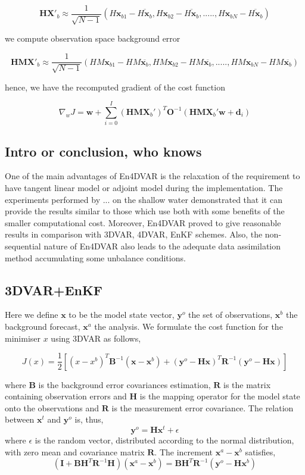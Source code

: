 \documentclass[a4,12pt]{article}
\numberwithin{equation}{section}
\begin{document}
$$\textbf{HX}'_{b} \approx \frac{1}{\sqrt{N-1}}(H\textbf{x}_{b1}-\overline{H\textbf{x}_{b}},H\textbf{x}_{b2}-\overline{H\textbf{x}_{b}},.....,H\textbf{x}_{bN}-\overline{H\textbf{x}_{b}})$$

we compute observation space background error

$$\textbf{HMX}'_{b} \approx \frac{1}{\sqrt{N-1}}(HM\textbf{x}_{b1}-HM\overline{\textbf{x}_{b}}, HM\textbf{x}_{b2}-HM\overline{\textbf{x}_{b}},.....,HM\textbf{x}_{bN}-HM\overline{\textbf{x}_{b}} )$$

hence, we have the recomputed gradient of the cost function

$$\nabla _{w}J = \textbf{w} + \sum_{i=0}^{I}(\textbf{HMX}_{b}')^{T}\textbf{O}^{-1}(\textbf{HMX}_{b}'\textbf{w}+\textbf{d}_{i})$$

\subsection{Intro or conclusion, who knows}

One of the main advantages of En4DVAR is the relaxation of the requirement to have tangent linear model or adjoint model during the implementation. The experiments performed by ... on the shallow water demonstrated that it can  provide the results similar to those which use both with some benefits of the smaller computational cost. Moreover, En4DVAR proved to give reasonable results in comparison with 3DVAR, 4DVAR, EnKF schemes. Also, the non-sequential nature of En4DVAR also leads to the adequate data assimilation method accumulating some unbalance conditions.  


\subsection{3DVAR+EnKF}
Here we define $\textbf{x}$ to be the model state vector, $\textbf{y}^{o}$ the set of observations, $\textbf{x}^{b}$ the background forecast, $\textbf{x}^{a}$ the analysis. We formulate the cost function for the minimiser $x$ using 3DVAR as follows,

$$J(x) = \frac{1}{2}[(x-x^{b})^{T}\textbf{B}^{-1}(\textbf{x}-\textbf{x}^{b})+(\textbf{y}^{o}-\textbf{H}\textbf{x})^{T}\textbf{R}^{-1}(\textbf{y}^{o}-\textbf{Hx})]$$

where $\textbf{B}$ is the background error covariances estimation, $\textbf{R}$ is the matrix containing observation errors and $\textbf{H}$ is the mapping operator for the model state onto the observations and  $\textbf{R}$ is the measurement error covariance. The relation between $\textbf{x}^{t}$ and $\textbf{y}^{o}$ is, thus, $$\textbf{y}^{o} = \textbf{H}\textbf{x}^{t} + \epsilon$$ where $\epsilon$ is the random vector, distributed according to the normal distribution, with zero mean and covariance matrix $\textbf{R}$. The increment $\textbf{x}^{a} - \textbf{x}^{b}$ satisfies, 
$$(\textbf{I} + \textbf{BH}^{T}\textbf{R}^{-1}\textbf{H})(\textbf{x}^{a}-\textbf{x}^{b}) = \textbf{B}\textbf{H}^{T}\textbf{R}^{-1}(\textbf{y}^{o}-\textbf{H}\textbf{x}^{b})$$   
\end{document}

